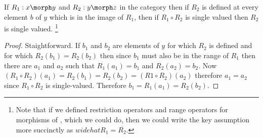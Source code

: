  \begin{lemma}
 If $R_1: x \morph y$ and $R_2: y \morph z$ in the category \Rel
 then if $R_2$ is defined at every element $b$ of $y$ which is in the image of $R_1$,
 then if $R_1 \circ R_2$ is single valued then $R_2$ is single valued. \footnote{Note that if we defined restriction operators and range operators for morphisms of \Rel,
 which we could do, then we could write the key assumption more succinctly as
 $widehat{R_1} = \overline{R_2}$.} 
 \end{lemma}
 \begin{proof}
 Staightforward. If $b_1$ and $b_2$ are elements of $y$ 
 for which $R_2$ is defined and for which $R_2(b_1) = R_2(b_2)$
  then since $b_1$ must also be in the range of $R_1$ then there are $a_1$ and $a_2$ such that $R_1(a_1)=b_1$
 and $R_2(a_2)=b_2$. Now 
 $(R_1 \circ R_2) (a_1)
 =R_2(b_1) = R_2(b_2) 
 = (R1 \circ R_2) (a_2)$ therefore $a_1 = a_2$ since $R_1 \circ R_2$ is single-valued. Therefore $b_1=R_1(a_1) = R_2(b_2)$.
 \end{proof}
